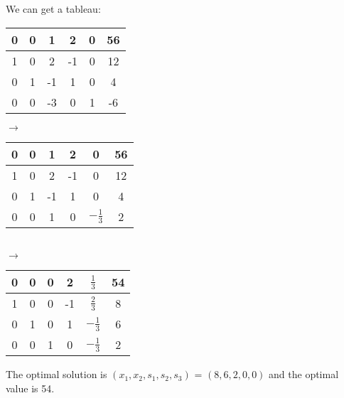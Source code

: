 \documentclass[12pt]{article}
\begin{document}
\begin{enumerate}
\begin{enumerate}
                        We can get a tableau:
                        \begin{table}[H]
                              \centering
                              \begin{tabular}{ccccc|c}
                                    0 & 0 & 1  & 2  & 0 & 56 \\
                                    \hline
                                    1 & 0 & 2  & -1 & 0 & 12 \\
                                    0 & 1 & -1 & 1  & 0 & 4  \\
                                    0 & 0 & -3 & 0  & 1 & -6 \\
                              \end{tabular}$\rightarrow$
                              \begin{tabular}{ccccc|c}
                                    0 & 0 & 1  & 2  & 0              & 56 \\
                                    \hline
                                    1 & 0 & 2  & -1 & 0              & 12 \\
                                    0 & 1 & -1 & 1  & 0              & 4  \\
                                    0 & 0 & 1  & 0  & $-\frac{1}{3}$ & 2  \\
                              \end{tabular}\\
                              $\rightarrow$
                              \begin{tabular}{ccccc|c}
                                    0 & 0 & 0 & 2  & $\frac{1}{3}$  & 54 \\
                                    \hline
                                    1 & 0 & 0 & -1 & $\frac{2}{3}$  & 8  \\
                                    0 & 1 & 0 & 1  & $-\frac{1}{3}$ & 6  \\
                                    0 & 0 & 1 & 0  & $-\frac{1}{3}$ & 2  \\
                              \end{tabular}
                        \end{table}
            \end{enumerate}
            The optimal solution is $(x_1,x_2,s_1,s_2,s_3)$ = $(8,6,2,0,0)$ and the optimal value is 54.
\end{enumerate}
\end{document}

